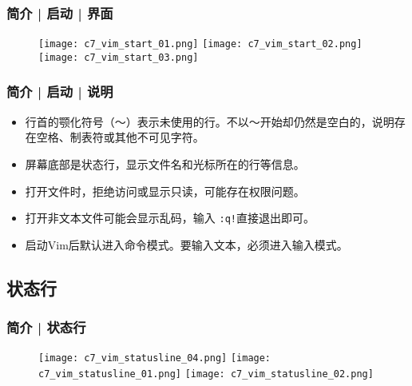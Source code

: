 \begin{frame}
  \frametitle{简介 | 启动 | 界面}
  \begin{figure}
    \centering
    \texttt{[image: c7\_vim\_start\_01.png]}\quad
    \texttt{[image: c7\_vim\_start\_02.png]}\\
    \texttt{[image: c7\_vim\_start\_03.png]}
  \end{figure}
\end{frame}

\begin{frame}[fragile]
  \frametitle{简介 | 启动 | 说明}
  \begin{itemize}[<+->]
    \item 行首的颚化符号（～）表示未使用的行。不以～开始却仍然是空白的，说明存在空格、制表符或其他不可见字符。
    \item 屏幕底部是状态行，显示文件名和光标所在的行等信息。
    \item 打开文件时，拒绝访问或显示只读，可能存在权限问题。
    \item 打开非文本文件可能会显示乱码，输入 \verb|:q!|直接退出即可。
    \item 启动Vim后默认进入命令模式。要输入文本，必须进入输入模式。
  \end{itemize}
\end{frame}

\subsection{状态行}
\begin{frame}
  \frametitle{简介 | 状态行}
  \begin{figure}
    \centering
    \texttt{[image: c7\_vim\_statusline\_04.png]}
    \vspace{0.2cm}
    \texttt{[image: c7\_vim\_statusline\_01.png]}
    \vspace{0.2cm}
    \texttt{[image: c7\_vim\_statusline\_02.png]}
  \end{figure}
\end{frame}

